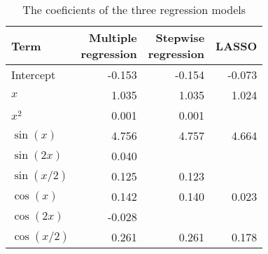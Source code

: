 \begin{table}[t]

\caption{\label{tab:compare-coefs}The coeficients of the three regression models}
\centering
\begin{tabular}{lrrr}
\toprule
Term & \makecell[r]{Multiple\\regression} & \makecell[r]{Stepwise\\regression} & LASSO\\
\midrule
Intercept & -0.153 & -0.154 & -0.073\\
\(x\) & 1.035 & 1.035 & 1.024\\
\(x^2\) & 0.001 & 0.001 & \\
\(\sin(x)\) & 4.756 & 4.757 & 4.664\\
\(\sin(2x)\) & 0.040 &  & \\
\(\sin(x/2)\) & 0.125 & 0.123 & \\
\(\cos(x)\) & 0.142 & 0.140 & 0.023\\
\(\cos(2x)\) & -0.028 &  & \\
\(\cos(x/2)\) & 0.261 & 0.261 & 0.178\\
\bottomrule
\end{tabular}
\end{table}